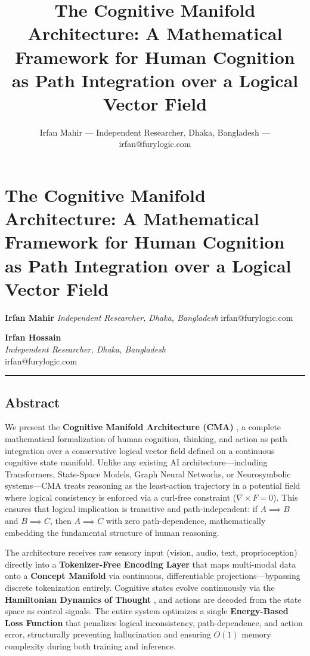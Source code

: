 \documentclass[
  11pt,
  a4paper,
]{article}
\title{The Cognitive Manifold Architecture: A Mathematical Framework for
Human Cognition as Path Integration over a Logical Vector Field}
\author{Irfan Mahir --- Independent Researcher, Dhaka, Bangladesh ---
irfan@furylogic.com}
\date{}
\begin{document}
\maketitle

{
\hypersetup{linkcolor=}
\setcounter{tocdepth}{3}
\tableofcontents
}
\section{The Cognitive Manifold Architecture: A Mathematical Framework
for Human Cognition as Path Integration over a Logical Vector
Field}\label{the-cognitive-manifold-architecture-a-mathematical-framework-for-human-cognition-as-path-integration-over-a-logical-vector-field}

\textbf{Irfan Mahir} \emph{Independent Researcher, Dhaka, Bangladesh}
irfan@furylogic.com

\textbf{Irfan Hossain}\\
\emph{Independent Researcher, Dhaka, Bangladesh}\\
irfan@furylogic.com

\begin{center}\rule{0.5\linewidth}{0.5pt}\end{center}

\subsection{Abstract}\label{abstract}

We present the \textbf{Cognitive Manifold Architecture (CMA)} , a
complete mathematical formalization of human cognition, thinking, and
action as path integration over a conservative logical vector field
defined on a continuous cognitive state manifold. Unlike any existing AI
architecture---including Transformers, State-Space Models, Graph Neural
Networks, or Neurosymbolic systems---CMA treats reasoning as the
least-action trajectory in a potential field where logical consistency
is enforced via a curl-free constraint (\(\nabla \times F = 0\)). This
ensures that logical implication is transitive and path-independent: if
\(A \implies B\) and \(B \implies C\), then \(A \implies C\) with zero
path-dependence, mathematically embedding the fundamental structure of
human reasoning.

The architecture receives raw sensory input (vision, audio, text,
proprioception) directly into a \textbf{Tokenizer-Free Encoding Layer}
that maps multi-modal data onto a \textbf{Concept Manifold} via
continuous, differentiable projections---bypassing discrete tokenization
entirely. Cognitive states evolve continuously via the
\textbf{Hamiltonian Dynamics of Thought} , and actions are decoded from
the state space as control signals. The entire system optimizes a single
\textbf{Energy-Based Loss Function} that penalizes logical
inconsistency, path-dependence, and action error, structurally
preventing hallucination and ensuring \(O(1)\) memory complexity during
both training and inference.
\end{document}

